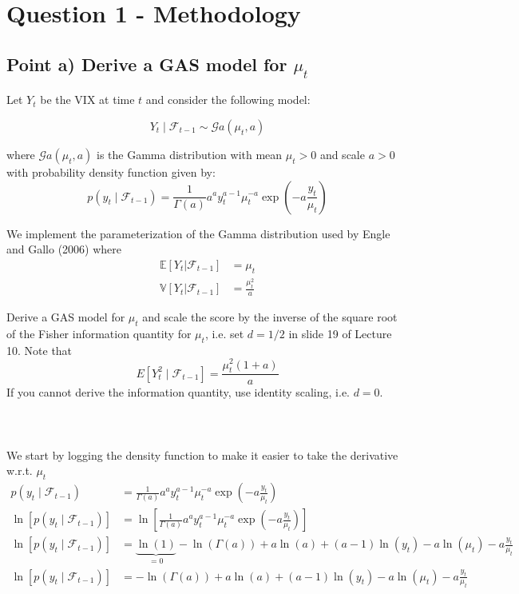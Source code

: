 \documentclass{article}
\begin{document}
\section{Question 1 - Methodology}

\subsection{Point a) Derive a GAS model for $\mu_{t}$}

Let $Y_{t}$ be the VIX at time $t$ and consider the following model:

\[
Y_{t}\mid\mathcal{F}_{t-1}\sim\mathcal{G}a\left(\mu_{t},a\right)
\]

where $\mathcal{G}a\left(\mu_{t},a\right)$ is the Gamma distribution
with mean $\mu_{t}>0$ and scale $a>0$ with probability density function
given by:
\[
p\left(y_{t}\mid\mathcal{F}_{t-1}\right)=\frac{1}{\Gamma(a)}a^{a}y_{t}^{a-1}\mu_{t}^{-a}\exp\left(-a\frac{y_{t}}{\mu_{t}}\right)
\]

We implement the parameterization of the Gamma distribution used by
Engle and Gallo (2006) where
\begin{align*}
\mathbb{E}\left[Y_{t}\rvert\mathcal{F}_{t-1}\right] & =\mu_{t}\\
\mathbb{V}\left[Y_{t}\rvert\mathcal{F}_{t-1}\right] & =\frac{\mu_{t}^{2}}{a}
\end{align*}

Derive a GAS model for $\mu_{t}$ and scale the score by the inverse
of the square root of the Fisher information quantity for $\mu_{t}$,
i.e. set $d=1/2$ in slide 19 of Lecture 10. Note that 
\[
E\left[Y_{t}^{2}\mid\mathcal{F}_{t-1}\right]=\frac{\mu_{t}^{2}(1+a)}{a}
\]
If you cannot derive the information quantity, use identity scaling,
i.e. $d=0$.\\
\\
\\
\\

We start by logging the density function to make it easier to take
the derivative w.r.t. $\mu_{t}$
\begin{align*}
p\left(y_{t}\mid\mathcal{F}_{t-1}\right) & =\frac{1}{\Gamma(a)}a^{a}y_{t}^{a-1}\mu_{t}^{-a}\exp\left(-a\frac{y_{t}}{\mu_{t}}\right)\\
\ln\left[p\left(y_{t}\mid\mathcal{F}_{t-1}\right)\right] & =\ln\left[\frac{1}{\Gamma(a)}a^{a}y_{t}^{a-1}\mu_{t}^{-a}\exp\left(-a\frac{y_{t}}{\mu_{t}}\right)\right]\\
\ln\left[p\left(y_{t}\mid\mathcal{F}_{t-1}\right)\right] & =\underbrace{\ln\left(1\right)}_{=0}-\ln\left(\Gamma\left(a\right)\right)+a\ln\left(a\right)+\left(a-1\right)\ln\left(y_{t}\right)-a\ln\left(\mu_{t}\right)-a\frac{y_{t}}{\mu_{t}}\\
\ln\left[p\left(y_{t}\mid\mathcal{F}_{t-1}\right)\right] & =-\ln\left(\Gamma\left(a\right)\right)+a\ln\left(a\right)+\left(a-1\right)\ln\left(y_{t}\right)-a\ln\left(\mu_{t}\right)-a\frac{y_{t}}{\mu_{t}}
\end{align*}
\end{document}
